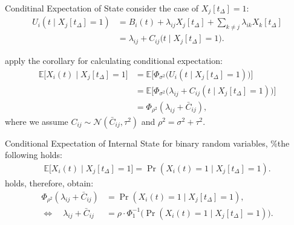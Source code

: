 \documentclass[fleqn,aspectratio=1610]{beamer}
\begin{document}
\begin{frame}[label={sec:org04047bd}]{Conditinal Expectation of State}
consider the case of \(X_j[t_{\Delta}]\!=\!1\):
\begin{align}
  U_{i}(t\mid X_j[t_{\Delta}]\!=\!1)
  &= B_i(t) + \lambda_{ij}X_j[t_{\Delta}] +
    \sum_{k \neq j}\lambda_{ik}X_k[t_{\Delta}]\\
  &= \lambda_{ij} + C_{ij}(t\mid X_j[t_{\Delta}]\!=\!1\bigr).
\end{align}

\pause
apply the corollary for calculating conditional expectation:
\begin{align}
  \mathbb{E}\bigl[X_i(t) \mid X_j[t_{\Delta}]\!=\!1\bigr]
  &= \mathbb{E}\bigl[\Phi_{\sigma^2}\bigl(U_{i}(t\mid X_j[t_{\Delta}]\!=\!1)\bigr)\bigr]\\
  &= \mathbb{E}\bigl[\Phi_{\sigma^2}\bigl(\lambda_{ij} +
    C_{ij}(t\mid X_j[t_{\Delta}]\!=\!1)\bigr)\bigr]\\
  &= \Phi_{\rho^2}(\lambda_{ij} + \bar{C}_{ij}),
\end{align}
where we assume \(C_{ij}\sim\mathcal{N}(\bar{C}_{ij},\tau^{2})\)
and \(\rho^2 = \sigma^2+\tau^2\).
\end{frame}

\begin{frame}[label={sec:org054d198}]{Conditional Expectation of Internal State}
for binary random variables, \%the following holds:
\begin{align}
  \mathbb{E}\bigl[X_i(t) \mid X_j[t_{\Delta}]\!=\!1\bigr]
  = \Pr(X_i(t)\!=\!1 \mid X_j[t_{\Delta}]\!=\!1).
\end{align}
holds,
therefore, obtain:
\begin{align}
  \Phi_{\rho^2}(\lambda_{ij} + \bar{C}_{ij})
  &= \Pr(X_i(t)=1 \mid X_j[t_{\Delta}]\!=\!1),\\
  \Leftrightarrow\quad
  \lambda_{ij} + \bar{C}_{ij}
  &= \rho\cdot\Phi^{-1}_{1}\bigl(\Pr(X_i(t)\!=\!1 \mid X_j[t_{\Delta}]\!=\!1)\bigr).
\end{align}
\end{frame}
\end{document}
